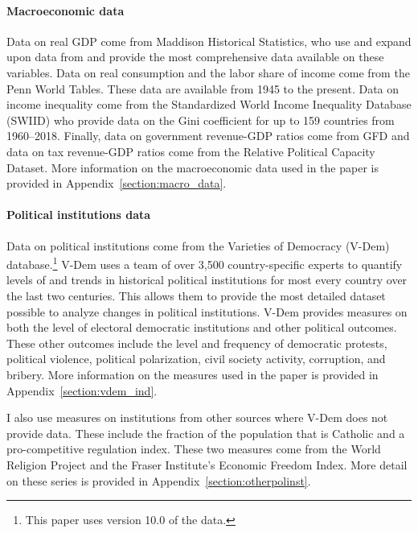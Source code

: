 \paragraph{Macroeconomic data}

Data on real GDP come from Maddison Historical Statistics, who use and expand upon data from \cite*{Barro2008} and provide the most comprehensive data available on these variables. Data on real consumption and the labor share of income come from the Penn World Tables.  These data are available from 1945 to the present. Data on income inequality come from the Standardized World Income Inequality Database (SWIID) who provide data on the Gini coefficient for up to 159 countries from 1960--2018. Finally, data on government revenue-GDP ratios come from GFD and data on tax revenue-GDP ratios come from the Relative Political Capacity Dataset. More information on the macroeconomic data used in the paper is provided in Appendix~\ref{section:macro_data}.

\paragraph{Political institutions data}

Data on political institutions come from the Varieties of Democracy (V-Dem) database.\footnote{This paper uses version 10.0 of the data.} V-Dem uses a team of over 3,500 country-specific experts to quantify levels of and trends in historical political institutions for most every country over the last two centuries. This allows them to provide the most detailed dataset possible to analyze changes in political institutions. V-Dem provides measures on both the level of electoral democratic institutions and other political outcomes. These other outcomes include the level and frequency of democratic protests, political violence, political polarization,  civil society activity, corruption, and bribery. More information on the measures used in the paper is provided in Appendix~\ref{section:vdem_ind}.

I also use measures on institutions from other sources where V-Dem does not provide data. These include the fraction of the population that is Catholic and a pro-competitive regulation index. These two measures come from the World Religion Project and the Fraser Institute's Economic Freedom Index. More detail on these series is provided in Appendix~\ref{section:otherpolinst}.

